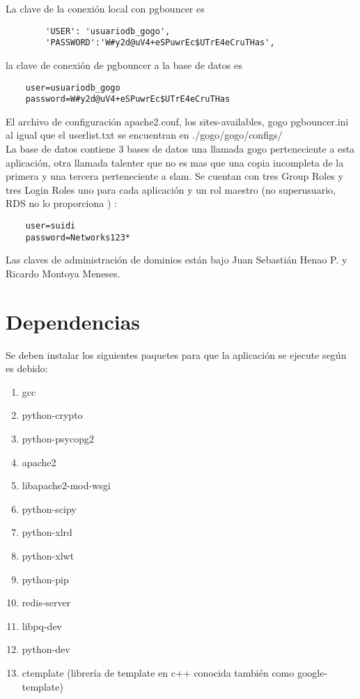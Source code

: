 \documentclass[10pt,a4paper]{book}
\begin{document}
	La clave de la conexión local con pgbouncer es
	\begin{verbatim}
		'USER': 'usuariodb_gogo',
		'PASSWORD':'W#y2d@uV4+eSPuwrEc$UTrE4eCruTHas',
	\end{verbatim}
	
	la clave de conexión de pgbouncer a la base de datos es
	\begin{verbatim}
	user=usuariodb_gogo
	password=W#y2d@uV4+eSPuwrEc$UTrE4eCruTHas
	\end{verbatim}
	
	El archivo de configuración apache2.conf, los sites-availables, gogo pgbouncer.ini al igual que el userlist.txt se encuentran en ./gogo/gogo/configs/ \\
	
	La base de datos contiene 3 bases de datos una llamada gogo perteneciente a esta aplicación, otra llamada talenter que no es mas que una copia incompleta de la primera y una tercera perteneciente a slam. Se cuentan con tres Group Roles y tres Login Roles uno para cada aplicación y un rol maestro (no superusuario, RDS no lo proporciona ) :
	\begin{verbatim}
	user=suidi 
	password=Networks123*
	\end{verbatim}
	
	Las claves de administración de dominios están bajo Juan Sebastián Henao P. y Ricardo Montoya Meneses.
	
	\section{Dependencias}
	
	Se deben instalar los siguientes paquetes para que la aplicación se ejecute según es debido:
	
	\begin{enumerate}
		\item gcc
		\item python-crypto
		\item python-psycopg2
		\item apache2 
		\item libapache2-mod-wsgi 
		\item python-scipy
		\item python-xlrd 
		\item python-xlwt 
		\item python-pip 
		\item redis-server 
		\item libpq-dev
		\item python-dev
		\item ctemplate (librería de template en c++ conocida también como google-template)
	\end{enumerate}
	
\end{document}
